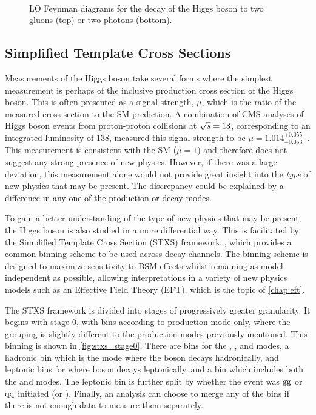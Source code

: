 \begin{figure}
  \centering
   \\
  \caption[LO Feynman Diagrams for \Hgluglu and \Hgg Decays]{LO Feynman diagrams for the decay of the Higgs boson to two gluons (top) or two photons (bottom).}\label{fig:higgs_loop_decay}
\end{figure}

\subsection{Simplified Template Cross Sections}\label{sec:stxs}

Measurements of the Higgs boson take several forms where the simplest measurement is perhaps of the inclusive production cross section of the Higgs boson. This is often presented as a signal strength, $\mu$, which is the ratio of the measured cross section to the SM prediction. A combination of CMS analyses of Higgs boson events from proton-proton collisions at $\sqrt{s}=13$\TeV, corresponding to an integrated luminosity of 138\fbinv, measured this signal strength to be $\mu = 1.014^{+0.055}_{-0.053}$~\cite{CMS-PAS-HIG-21-018}. This measurement is consistent with the SM ($\mu=1$) and therefore does not suggest any strong presence of new physics. However, if there was a large deviation, this measurement alone would not provide great insight into the \textit{type} of new physics that may be present. The discrepancy could be explained by a difference in any one of the production or decay modes. 

To gain a better understanding of the type of new physics that may be present, the Higgs boson is also studied in a more differential way. This is facilitated by the Simplified Template Cross Section (STXS) framework~\cite{LHCHiggsCrossSectionWorkingGroup:2016ypw}, which provides a common binning scheme to be used across decay channels. The binning scheme is designed to maximize sensitivity to BSM effects whilst remaining as model-independent as possible, allowing interpretations in a variety of new physics models such as an Effective Field Theory (EFT), which is the topic of \cref{chap:eft}. 

The STXS framework is divided into stages of progressively greater granularity. It begins with stage 0, with bins according to production mode only, where the grouping is slightly different to the production modes previously mentioned. This binning is shown in \cref{fig:stxs_stage0}. There are bins for the \ggH, \VBF, \ttH and \bbH modes, a \VH hadronic bin which is the \VH mode where the \PV boson decays hadronically, \WH and \ZH leptonic bins for where \PV boson decays leptonically, and a \tH bin which includes both the \tHq and \tHW modes. The \ZH leptonic bin is further split by whether the event was $\mathrm{g}\mathrm{g}$ or $\mathrm{q}\mathrm{q}$ initiated (\ggZH or \qqZH). Finally, an analysis can choose to merge any of the bins if there is not enough data to measure them separately. 

